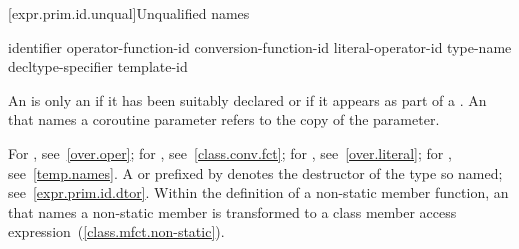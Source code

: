[expr.prim.id.unqual]{Unqualified names}

\begin{bnf}
\br
    identifier\br
    operator-function-id\br
    conversion-function-id\br
    literal-operator-id\br
    \terminal{\~} type-name\br
    \terminal{\~} decltype-specifier\br
    template-id
\end{bnf}

\pnum
{}%
An  is only
an  if it has
been suitably declared
or if it appears as part of a .
An  that names a coroutine parameter
refers to the copy of the parameter.
\begin{note}
For , see~\ref{over.oper}; for
, see~\ref{class.conv.fct}; for
, see~\ref{over.literal}; for
, see~\ref{temp.names}.
A  or 
prefixed by \tcode{\~} denotes the destructor of the type so named;
see~\ref{expr.prim.id.dtor}.
Within the definition of a non-static member function, an
 that names a non-static member is transformed to a
class member access expression~(\ref{class.mfct.non-static}).
\end{note}

